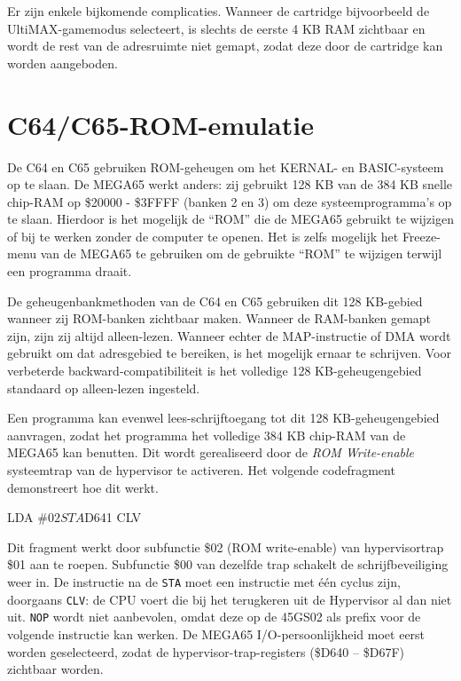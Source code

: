 Er zijn enkele bijkomende complicaties. Wanneer de cartridge bijvoorbeeld de UltiMAX\texttrademark{}-gamemodus selecteert, is slechts de eerste 4 KB RAM zichtbaar en wordt de rest van de adresruimte niet gemapt, zodat deze door de cartridge kan worden aangeboden.

\section{C64/C65-ROM-emulatie}

De C64 en C65 gebruiken ROM-geheugen om het KERNAL- en BASIC-systeem op te slaan. De MEGA65 werkt anders: zij gebruikt 128 KB van de 384 KB snelle chip-RAM op \$20000 - \$3FFFF (banken 2 en 3) om deze systeemprogramma's op te slaan. Hierdoor is het mogelijk de ``ROM'' die de MEGA65 gebruikt te wijzigen of bij te werken zonder de computer te openen. Het is zelfs mogelijk het Freeze-menu van de MEGA65 te gebruiken om de gebruikte ``ROM'' te wijzigen terwijl een programma draait.

De geheugenbankmethoden van de C64 en C65 gebruiken dit 128 KB-gebied wanneer zij ROM-banken zichtbaar maken. Wanneer de RAM-banken gemapt zijn, zijn zij altijd alleen-lezen. Wanneer echter de MAP-instructie of DMA wordt gebruikt om dat adresgebied te bereiken, is het mogelijk ernaar te schrijven. Voor verbeterde backward-compatibiliteit is het volledige 128 KB-geheugengebied standaard op alleen-lezen ingesteld.

Een programma kan evenwel lees-schrijftoegang tot dit 128 KB-geheugengebied aanvragen, zodat het programma het volledige 384 KB chip-RAM van de MEGA65 kan benutten. Dit wordt gerealiseerd door de {\em ROM Write-enable} systeemtrap van de hypervisor te activeren. Het volgende codefragment demonstreert hoe dit werkt.

\begin{screencode}
  LDA #$02
  STA $D641
  CLV
\end{screencode}

Dit fragment werkt door subfunctie \$02 (ROM write-enable) van hypervisortrap \$01 aan te roepen. Subfunctie \$00 van dezelfde trap schakelt de schrijfbeveiliging weer in. De instructie na de {\tt STA} moet een instructie met één cyclus zijn, doorgaans {\tt CLV}: de CPU voert die bij het terugkeren uit de Hypervisor al dan niet uit. {\tt NOP} wordt niet aanbevolen, omdat deze op de 45GS02 als prefix voor de volgende instructie kan werken. De MEGA65 I/O-persoonlijkheid moet eerst worden geselecteerd, zodat de hypervisor-trap-registers (\$D640 -- \$D67F) zichtbaar worden.

